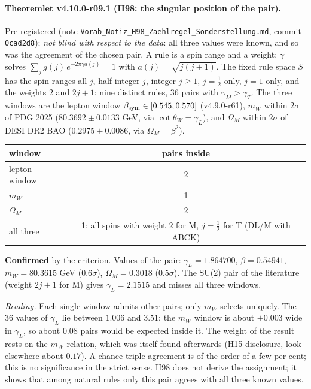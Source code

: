\paragraph{Theoremlet v4.10.0-r09.1 (H98: the singular position of the pair).}
Pre-registered (note \texttt{Vorab\_\allowbreak Notiz\_\allowbreak H98\_\allowbreak Zaehlregel\_\allowbreak Sonderstellung.md}, commit \texttt{0cad2d8}); \emph{not blind with respect to
the data}: all three values were known, and so was the agreement of the chosen pair.  A rule is a spin range and a weight; \(\gamma\) solves
\(\sum_j g(j)\,e^{-2\pi\gamma a(j)}=1\) with \(a(j)=\sqrt{j(j+1)}\).  The fixed rule space \(S\) has the spin ranges all \(j\), half-integer \(j\), integer
\(j\ge1\), \(j=\tfrac12\) only, \(j=1\) only, and the weights \(2\) and \(2j+1\): nine distinct rules, \(36\) pairs with \(\gamma_M>\gamma_T\).  The three windows are the
lepton window \(\beta_{\rm sym}\in[0.545,0.570]\) (v4.9.0-r61), \(m_W\) within \(2\sigma\) of PDG 2025 (\(80.3692\pm0.0133\) GeV, via \(\cot\theta_W=\gamma_L\)), and
\(\Omega_M\) within \(2\sigma\) of DESI DR2 BAO (\(0.2975\pm0.0086\), via \(\Omega_M=\beta^2\)).
\begin{center}
\small
\begin{tabular}{@{}lc@{}}
\toprule
window & pairs inside\\
\midrule
lepton window & 2\\
\(m_W\) & 1\\
\(\Omega_M\) & 2\\
all three & 1: all spins with weight \(2\) for M, \(j=\tfrac12\) for T (DL/M with ABCK)\\
\bottomrule
\end{tabular}
\end{center}
\textbf{Confirmed} by the criterion.  Values of the pair: \(\gamma_L=1.864700\), \(\beta=0.54941\), \(m_W=80.3615\) GeV (\(0.6\sigma\)), \(\Omega_M=0.3018\) (\(0.5\sigma\)).  The
SU(2) pair of the literature (weight \(2j+1\) for M) gives \(\gamma_L=2.1515\) and misses all three windows.

\emph{Reading.}  Each single window admits other pairs; only \(m_W\) selects uniquely.  The \(36\) values of \(\gamma_L\) lie between \(1.006\) and \(3.51\); the \(m_W\)
window is about \(\pm0.003\) wide in \(\gamma_L\), so about \(0.08\) pairs would be expected inside it.  The weight of the result rests on the \(m_W\) relation,
which was itself found afterwards (H15 disclosure, look-elsewhere about \(0.17\)).  A chance triple agreement is of the order of a few per cent; this
is no significance in the strict sense.  H98 does not derive the assignment; it shows that among natural rules only this pair agrees with all three
known values.

